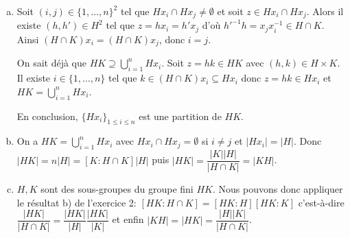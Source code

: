 \begin{enumerate}[a)]
  \item Soit $(i,j)\in\{1,\dots,n\}^2$ tel que $Hx_i\cap Hx_j\neq\emptyset$ et
    soit $z\in Hx_i\cap Hx_j$. Alors il existe $(h,h')\in H^2$ tel que
    $z=hx_i=h'x_j$ d'où $h'^{-1}h=x_jx_i^{-1}\in H\cap K$. Ainsi $(H\cap
    K)x_i=(H\cap K)x_j$, donc $i=j$.

    On sait déjà que $HK\supseteq\bigcup_{i=1}^{n} Hx_i$. Soit $z=hk\in HK$ avec
    $(h,k)\in H\times K$.  Il existe $i\in \{1,\dots,n\}$ tel que $k\in
    (H\cap K)x_i\subseteq Hx_i$ donc $z=hk\in Hx_i$ et
    $HK=\bigcup_{i=1}^n Hx_i$.

    En conclusion, $\{Hx_i\}_{1\leqslant i\leqslant n}$ est une partition de
    $HK$.

  \item On a $HK=\bigcup_{i=1}^{n} Hx_i$ avec $Hx_i\cap Hx_j=\emptyset$ si
    $i\neq j$ et $|Hx_i|=|H|$. Donc $|HK|=n|H|=[K\colon H\cap K]|H|$ puis
    $|HK|=\dfrac{|K||H|}{|H\cap K|}=|KH|$.

  \item $H, K$ sont des sous-groupes du groupe fini $HK$. Nous pouvons donc
    appliquer le résultat b) de l'exercice 2:
    $[HK\colon H\cap K]=[HK\colon H][HK\colon K]$ c'est-à-dire
    $\dfrac{|HK|}{|H\cap K|}=\dfrac{|HK|}{|H|}\dfrac{|HK|}{|K|}$
    et enfin $|KH|=|HK|=\dfrac{|H||K|}{|H\cap K|}$.
\end{enumerate}

